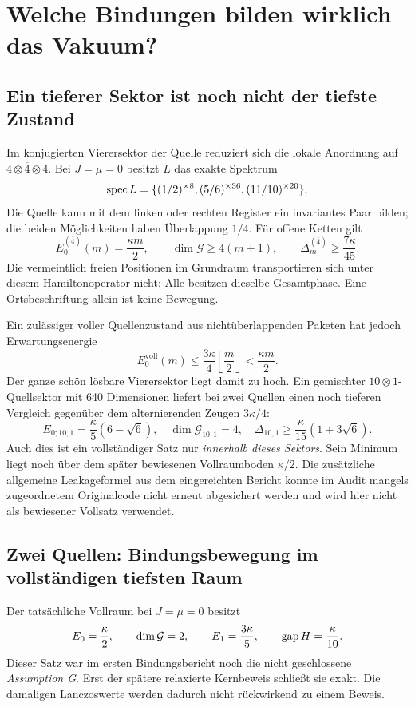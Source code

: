 \chapter{Welche Bindungen bilden wirklich das Vakuum?}
\section{Ein tieferer Sektor ist noch nicht der tiefste Zustand}
Im konjugierten Vierersektor der Quelle reduziert sich die lokale Anordnung auf $4\otimes\overline4\otimes4$. Bei $J=\mu=0$ besitzt $L$ das exakte Spektrum
\[
 \operatorname{spec} L=\{(1/2)^{\times8},(5/6)^{\times36},(11/10)^{\times20}\}.
\]
Die Quelle kann mit dem linken oder rechten Register ein invariantes Paar bilden; die beiden Möglichkeiten haben Überlappung $1/4$. Für offene Ketten gilt
\[
 E_0^{(\overline4)}(m)=\frac{\kappa m}2,\qquad
 \dim\mathcal G\ge4(m+1),\qquad
 \Delta_m^{(\overline4)}\ge\frac{7\kappa}{45}.
\]
Die vermeintlich freien Positionen im Grundraum transportieren sich unter diesem Hamiltonoperator nicht: Alle besitzen dieselbe Gesamtphase. Eine Ortsbeschriftung allein ist keine Bewegung. 

Ein zulässiger voller Quellenzustand aus nichtüberlappenden Paketen hat jedoch Erwartungsenergie
\[
 E_0^{\mathrm{voll}}(m)\le\frac{3\kappa}{4}\left\lfloor\frac m2\right\rfloor
 <\frac{\kappa m}2.
\]
Der ganze schön lösbare Vierersektor liegt damit zu hoch. Ein gemischter $10\otimes1$-Quellsektor mit 640 Dimensionen liefert bei zwei Quellen einen noch tieferen Vergleich gegenüber dem alternierenden Zeugen $3\kappa/4$:
\[
 E_{0;10,1}=\frac\kappa5(6-\sqrt6),\quad
 \dim\mathcal G_{10,1}=4,\quad
 \Delta_{10,1}\ge\frac\kappa{15}(1+3\sqrt6).
\]
Auch dies ist ein vollständiger Satz nur \emph{innerhalb dieses Sektors}. Sein Minimum liegt noch über dem später bewiesenen Vollraumboden $\kappa/2$. Die zusätzliche allgemeine Leakageformel aus dem eingereichten Bericht konnte im Audit mangels zugeordnetem Originalcode nicht erneut abgesichert werden und wird hier nicht als bewiesener Vollsatz verwendet. 

\section{Zwei Quellen: Bindungsbewegung im vollständigen tiefsten Raum}
Der tatsächliche Vollraum bei $J=\mu=0$ besitzt
\[
 E_0=\frac\kappa2,\qquad\dim\mathcal G=2,\qquad
 E_1=\frac{3\kappa}5,\qquad\operatorname{gap} H=\frac\kappa{10}.
\]
Dieser Satz war im ersten Bindungsbericht noch die nicht geschlossene \emph{Assumption G}. Erst der spätere relaxierte Kernbeweis schließt sie exakt. Die damaligen Lanczoswerte werden dadurch nicht rückwirkend zu einem Beweis. 

